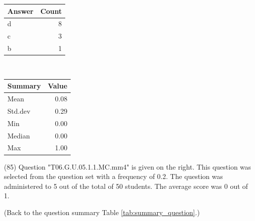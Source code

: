 \documentclass[12pt,english,nohyper]{tufte-handout}\usepackage[]{graphicx}\usepackage[]{color}
\begin{document}
\begin{center}%
\begin{tabular}{lr}
  \hline
Answer & Count \\ 
  \hline
d &   8 \\ 
  c &   3 \\ 
  b &   1 \\ 
   \hline
\end{tabular}
~~~~~~~~%
\begin{tabular}{lr}
  \hline
Summary & Value \\ 
  \hline
Mean & 0.08 \\ 
  Std.dev & 0.29 \\ 
  Min & 0.00 \\ 
  Median & 0.00 \\ 
  Max & 1.00 \\ 
   \hline
\end{tabular}
\end{center}\newpage{} (85) Question "T06.G.U.05.1.1.MC.mm4" is given on the right. This question was selected from the question set with a frequency of 0.2. The question was administered to 5 out of the total of 50 students. The average score was 0 out of 1.

 (Back to the question summary Table \ref{tab:summary_question}.)
\end{document}
